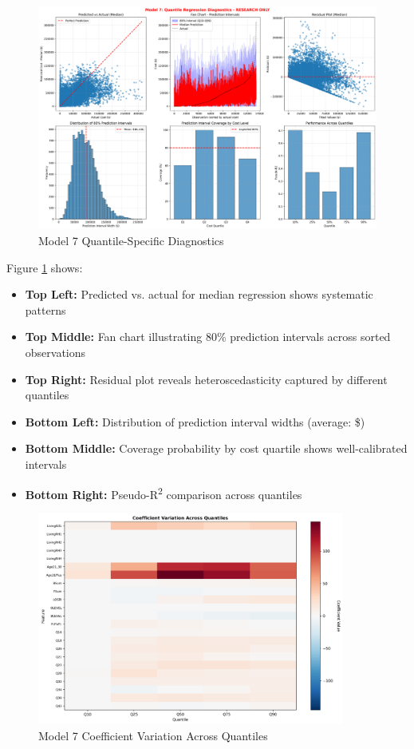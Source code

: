 \begin{figure}[H]
\centering
\includegraphics[width=\textwidth]{models/model_7/quantile_diagnostics.png}
\caption{Model 7 Quantile-Specific Diagnostics}
\label{fig:model7_quantile}
\end{figure}

Figure \ref{fig:model7_quantile} shows:
\begin{itemize}
\item \textbf{Top Left:} Predicted vs. actual for median regression shows systematic patterns
\item \textbf{Top Middle:} Fan chart illustrating 80\% prediction intervals across sorted observations
\item \textbf{Top Right:} Residual plot reveals heteroscedasticity captured by different quantiles
\item \textbf{Bottom Left:} Distribution of prediction interval widths (average: \$\ModelSevenPredictionIntervalWidth)
\item \textbf{Bottom Middle:} Coverage probability by cost quartile shows well-calibrated intervals
\item \textbf{Bottom Right:} Pseudo-R\textsuperscript{2} comparison across quantiles
\end{itemize}

\begin{figure}[H]
\centering
\includegraphics[width=0.9\textwidth]{models/model_7/quantile_coefficients.png}
\caption{Model 7 Coefficient Variation Across Quantiles}
\label{fig:model7_coefficients}
\end{figure}

